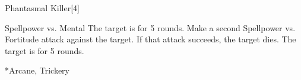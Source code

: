 \begin{spellsection}{Phantasmal Killer}[4]
    \begin{spellheader}
    \end{spellheader}
    \begin{spellcontent}
        \begin{spelltargetinginfo}
        \end{spelltargetinginfo}
        \begin{spelleffects}
            \begin{spellattack}{Spellpower vs. Mental}
                \spellsuccess The target is \frightened for 5 rounds.
                \spellcritical Make a second Spellpower vs. Fortitude attack against the target. If that attack succeeds, the target dies.
                \spellfailure The target is \shaken for 5 rounds.
            \end{spellattack}
        \end{spelleffects}
    \end{spellcontent}
    \begin{spellfooter}
        *{Arcane, Trickery}
        \miscastrandom
    \end{spellfooter}
    \begin{spellaugments}
    \end{spellaugments}
\end{spellsection}

